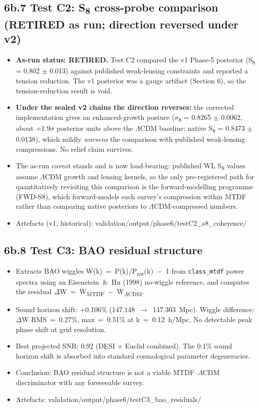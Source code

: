 \documentclass[11pt,a4paper]{article}
\begin{document}
\subsection{6b.7 Test C2: S\textsubscript{8} cross-probe comparison (RETIRED as run; direction reversed under v2)}
\begin{itemize}
  \item \textbf{As-run status: RETIRED.} Test C2 compared the v1 Phase-5 posterior (S\textsubscript{8} = 0.802 $\pm$ 0.013) against published weak-lensing constraints and reported a tension reduction. The v1 posterior was a gauge artifact (Section 6), so the tension-reduction result is void.
  \item \textbf{Under the sealed v2 chains the direction reverses:} the corrected implementation gives an enhanced-growth posture ($\sigma$\textsubscript{8} = 0.8265 $\pm$ 0.0062, about +1.9$\sigma$ posterior units above the $\Lambda$CDM baseline; native S\textsubscript{8} = 0.8473 $\pm$ 0.0138), which mildly \emph{worsens} the comparison with published weak-lensing compressions. No relief claim survives.
  \item The as-run caveat stands and is now load-bearing: published WL S\textsubscript{8} values assume $\Lambda$CDM growth and lensing kernels, so the only pre-registered path for quantitatively revisiting this comparison is the forward-modelling programme (FWD-S8), which forward-models each survey's compression within MTDF rather than comparing native posteriors to $\Lambda$CDM-compressed numbers.
  \item Artefacts (v1, historical): validation/\allowbreak{}output/\allowbreak{}phase6/\allowbreak{}testC2\_\allowbreak{}s8\_\allowbreak{}coherence/\allowbreak{}
\end{itemize}

\subsection{6b.8 Test C3: BAO residual structure}
\begin{itemize}
  \item Extracts BAO wiggles W(k)~=~P(k)/P\textsubscript{nw}(k)~$-$~1 from \texttt{class\_\allowbreak{}mtdf} power spectra using an Eisenstein~\&~Hu (1998) no-wiggle reference, and computes the residual $\Delta$W~=~W\textsubscript{MTDF}~$-$~W\textsubscript{$\Lambda$CDM}.
  \item Sound horizon shift: +0.106\% (147.148~$\rightarrow$~147.303~Mpc). Wiggle difference: $\Delta$W RMS~=~0.27\%, max~=~0.51\% at k~=~0.12~h/\allowbreak{}Mpc. No detectable peak phase shift at grid resolution.
  \item Best projected SNR: 0.92 (DESI + Euclid combined). The 0.1\% sound horizon shift is absorbed into standard cosmological parameter degeneracies.
  \item Conclusion: BAO residual structure is not a viable MTDF--$\Lambda$CDM discriminator with any foreseeable survey.
  \item Artefacts: validation/\allowbreak{}output/\allowbreak{}phase6/\allowbreak{}testC3\_\allowbreak{}bao\_\allowbreak{}residuals/\allowbreak{}
\end{itemize}
\end{document}
